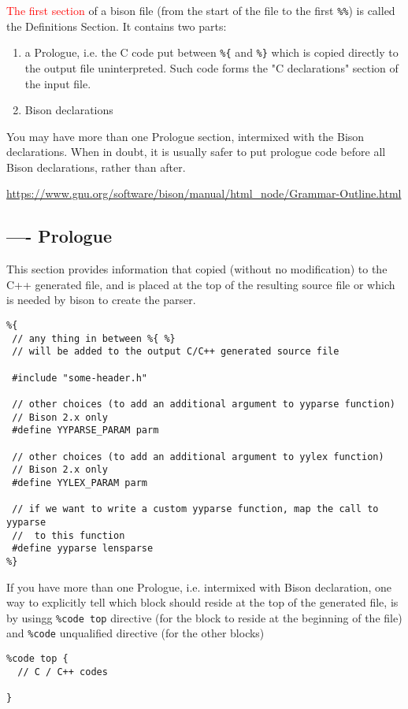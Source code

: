 \textcolor{red}{The first section} of a bison file (from the start of the file
to the first \verb!%%!) is called the Definitions Section.
It contains two parts: 
\begin{enumerate}
  \item a Prologue, i.e. the C code  put between \verb!%{! and
\verb!%}! which is copied directly to the output file uninterpreted. Such code
forms the "C declarations" section of the input file.

  \item Bison declarations
\end{enumerate}
You may have more than one Prologue section, intermixed with the Bison declarations. 
When in doubt, it is usually safer to put prologue code before all Bison declarations, rather than after. 

\url{https://www.gnu.org/software/bison/manual/html_node/Grammar-Outline.html}


\subsection{---- Prologue}

This section provides information that copied (without no modification) to the
C++ generated file, and is placed at the top of the resulting source file or
which is needed by bison to create the parser.

{\tiny
\begin{verbatim}
%{
 // any thing in between %{ %}
 // will be added to the output C/C++ generated source file
 
 #include "some-header.h"
 
 // other choices (to add an additional argument to yyparse function)
 // Bison 2.x only
 #define YYPARSE_PARAM parm
 
 // other choices (to add an additional argument to yylex function)
 // Bison 2.x only
 #define YYLEX_PARAM parm
 
 // if we want to write a custom yyparse function, map the call to yyparse 
 //  to this function
 #define yyparse lensparse
%}
\end{verbatim}  
}

If you have more than one Prologue, i.e. intermixed with Bison declaration, one
way to explicitly tell which block should reside at the top of the generated
file, is by usingg \verb!%code top! directive (for the block to reside at the
beginning of the file) and \verb!%code! unqualified directive (for the other
blocks)
\begin{verbatim}
%code top {
  // C / C++ codes
  
}
\end{verbatim}

